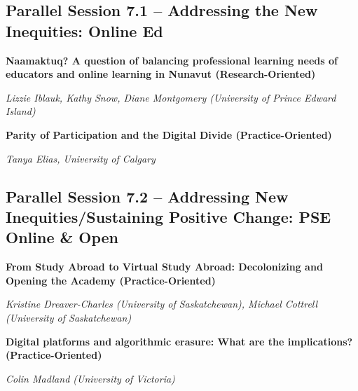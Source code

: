 \documentclass[
]{book}
\begin{document}
\hypertarget{parallel-session-7.1-addressing-the-new-inequities-online-ed}{%
\subsection*{Parallel Session 7.1 -- Addressing the New Inequities: Online Ed}\label{parallel-session-7.1-addressing-the-new-inequities-online-ed}}

\begin{secondary}
\textbf{Naamaktuq? A question of balancing professional learning needs
of educators and online learning in Nunavut (Research-Oriented)}

\emph{Lizzie Iblauk, Kathy Snow, Diane Montgomery (University of Prince
Edward Island)}
\end{secondary}

\begin{secondary}
\textbf{Parity of Participation and the Digital Divide
(Practice-Oriented)}

\emph{Tanya Elias, University of Calgary}
\end{secondary}

\hypertarget{parallel-session-7.2-addressing-new-inequitiessustaining-positive-change-pse-online-open}{%
\subsection*{Parallel Session 7.2 -- Addressing New Inequities/Sustaining Positive Change: PSE Online \& Open}\label{parallel-session-7.2-addressing-new-inequitiessustaining-positive-change-pse-online-open}}

\begin{secondary}
\textbf{From Study Abroad to Virtual Study Abroad: Decolonizing and
Opening the Academy (Practice-Oriented)}

\emph{Kristine Dreaver-Charles (University of Saskatchewan), Michael
Cottrell (University of Saskatchewan)}
\end{secondary}

\begin{secondary}
\textbf{Digital platforms and algorithmic erasure: What are the
implications? (Practice-Oriented)}

\emph{Colin Madland (University of Victoria)}
\end{secondary}
\end{document}
